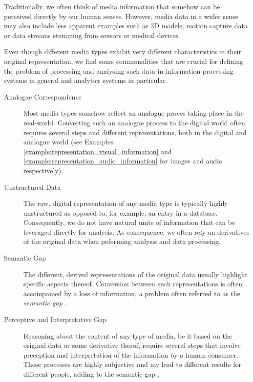 Traditionally, we often think of media information that somehow can be perceived directly by our human senses. However, media data in a wider sense may also include less apparent examples such as 3D models, motion capture data or data streams stemming from sensors or medical devices. 

Even though different media types exhibit very different characteristics in their original representation, we find some commonalities that are crucial for defining the problem of processing and analysing such data in information processing systems in general and analytics systems in particular.

\begin{description}
    \item[Analogue Correspondence] Most media types somehow reflect an analogue proces taking place in the real-world. Converting such an analogue process to the digital world often requires several steps and different representations, both in the digital and analogue world (see Examples \ref{example:representation_visual_information} and \ref{example:representation_audio_information} for images and audio respectively).

    \item[Unstructured Data] The raw, digital representation of any media type is typically highly unstructured as opposed to, for example, an entry in a database. Consequently, we do not have natural units of information that can be leveraged directly for analysis. As consequence, we often rely on derivatives of the original data when peforming analysis and data processing.
    
    \item[Semantic Gap] The different, derived representations of the original data usually highlight specific aspects thereof. Conversion between such representations is often accompanied by a loss of information, a problem often referred to as the \emph{semantic gap} \cite{Blanken:2007multimedia, Rossetto:2018thesis}.

    \item[Perceptive and Interpretative Gap] Reasoning about the content of any type of media, be it based on the original data or some derivative therof, require several steps that involve preception and interpretation of the information by a human consumer. These processes are highly subjective and my lead to different results for different people, adding to the semantic gap \cite{Rossetto:2018thesis}.
\end{description}

